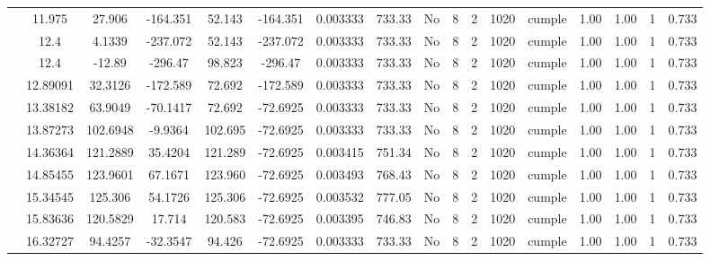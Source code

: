 \begin{table}[H]
{\begin{tabular}{|c|c|c|c|c|c|c|c|c|c|c|c|c|c|c|c|c|}
\cline{2-17}    & 11.975 & 27.906 & -164.351 & 52.143 & -164.351 & 0.003333 & 733.33 & No  & 8   & 2   & 1020 & \cellcolor[rgb]{ .776,  .937,  .808}cumple & 1.00 & 1.00 & 1   & 0.733 \bigstrut\\
\cline{2-17}    & \cellcolor[rgb]{ .851,  .882,  .949}12.4 & 4.1339 & -237.072 & 52.143 & -237.072 & 0.003333 & 733.33 & No  & 8   & 2   & 1020 & \cellcolor[rgb]{ .776,  .937,  .808}cumple & 1.00 & 1.00 & 1   & 0.733 \bigstrut\\
\cline{2-17}    & \cellcolor[rgb]{ .851,  .882,  .949}12.4 & -12.89 & -296.47 & 98.823 & -296.47 & 0.003333 & 733.33 & No  & 8   & 2   & 1020 & \cellcolor[rgb]{ .776,  .937,  .808}cumple & 1.00 & 1.00 & 1   & 0.733 \bigstrut\\
\cline{2-17}    & 12.89091 & 32.3126 & -172.589 & 72.692 & -172.589 & 0.003333 & 733.33 & No  & 8   & 2   & 1020 & \cellcolor[rgb]{ .776,  .937,  .808}cumple & 1.00 & 1.00 & 1   & 0.733 \bigstrut\\
\cline{2-17}    & 13.38182 & 63.9049 & -70.1417 & 72.692 & -72.6925 & 0.003333 & 733.33 & No  & 8   & 2   & 1020 & \cellcolor[rgb]{ .776,  .937,  .808}cumple & 1.00 & 1.00 & 1   & 0.733 \bigstrut\\
\cline{2-17}    & 13.87273 & 102.6948 & -9.9364 & 102.695 & -72.6925 & 0.003333 & 733.33 & No  & 8   & 2   & 1020 & \cellcolor[rgb]{ .776,  .937,  .808}cumple & 1.00 & 1.00 & 1   & 0.733 \bigstrut\\
\cline{2-17}    & 14.36364 & 121.2889 & 35.4204 & 121.289 & -72.6925 & 0.003415 & 751.34 & No  & 8   & 2   & 1020 & \cellcolor[rgb]{ .776,  .937,  .808}cumple & 1.00 & 1.00 & 1   & 0.733 \bigstrut\\
\cline{2-17}    & 14.85455 & 123.9601 & 67.1671 & 123.960 & -72.6925 & 0.003493 & 768.43 & No  & 8   & 2   & 1020 & \cellcolor[rgb]{ .776,  .937,  .808}cumple & 1.00 & 1.00 & 1   & 0.733 \bigstrut\\
\cline{2-17}    & 15.34545 & 125.306 & 54.1726 & 125.306 & -72.6925 & 0.003532 & 777.05 & No  & 8   & 2   & 1020 & \cellcolor[rgb]{ .776,  .937,  .808}cumple & 1.00 & 1.00 & 1   & 0.733 \bigstrut\\
\cline{2-17}    & 15.83636 & 120.5829 & 17.714 & 120.583 & -72.6925 & 0.003395 & 746.83 & No  & 8   & 2   & 1020 & \cellcolor[rgb]{ .776,  .937,  .808}cumple & 1.00 & 1.00 & 1   & 0.733 \bigstrut\\
\cline{2-17}    & 16.32727 & 94.4257 & -32.3547 & 94.426 & -72.6925 & 0.003333 & 733.33 & No  & 8   & 2   & 1020 & \cellcolor[rgb]{ .776,  .937,  .808}cumple & 1.00 & 1.00 & 1   & 0.733 \bigstrut\\

\end{tabular}}
\end{table}
